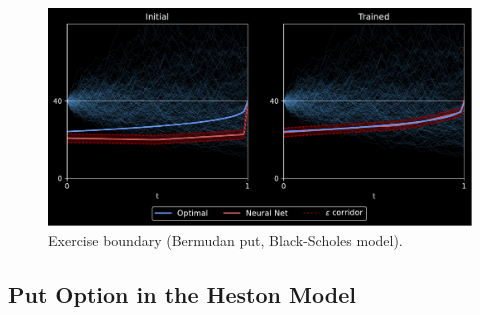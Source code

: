 \begin{figure}
    \centering
    \caption{Exercise boundary (Bermudan put,  Black-Scholes model).}
    \includegraphics[scale=0.5]{FB/Figures/Bdry 2, lbda=0.275, mu=0.050, N=50.pdf}
    
    \label{fig:putBS}
\end{figure}

    


\subsection{Put Option in the Heston Model}\label{sec:putHeston}

